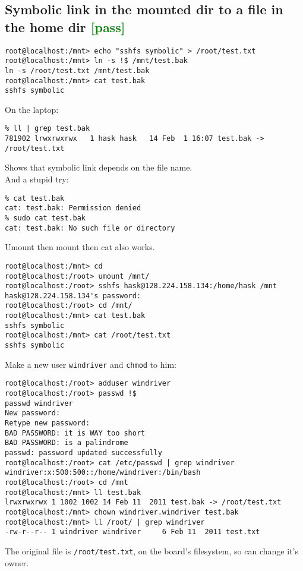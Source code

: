 \documentclass[a4paper]{report}
\begin{document}
\begin{enumerate}
\subsection{Symbolic link in the mounted dir to a file in the home dir
            \textcolor{green}{[pass]}}
\begin{lstlisting}
root@localhost:/mnt> echo "sshfs symbolic" > /root/test.txt 
root@localhost:/mnt> ln -s !$ /mnt/test.bak
ln -s /root/test.txt /mnt/test.bak
root@localhost:/mnt> cat test.bak 
sshfs symbolic
\end{lstlisting}
On the laptop:
\begin{lstlisting}
% ll | grep test.bak
781902 lrwxrwxrwx   1 hask hask   14 Feb  1 16:07 test.bak -> /root/test.txt
\end{lstlisting}
Shows that symbolic link depends on the file name.\\
And a stupid try:
\begin{lstlisting}
% cat test.bak          
cat: test.bak: Permission denied
% sudo cat test.bak
cat: test.bak: No such file or directory
\end{lstlisting}
Umount then mount then cat also works.
\begin{lstlisting}
root@localhost:/mnt> cd 
root@localhost:/root> umount /mnt/
root@localhost:/root> sshfs hask@128.224.158.134:/home/hask /mnt
hask@128.224.158.134's password: 
root@localhost:/root> cd /mnt/
root@localhost:/mnt> cat test.bak 
sshfs symbolic
root@localhost:/mnt> cat /root/test.txt 
sshfs symbolic
\end{lstlisting}
Make a new user {\tt windriver} and {\tt chmod} to him:
\begin{lstlisting}
root@localhost:/root> adduser windriver
root@localhost:/root> passwd !$
passwd windriver
New password: 
Retype new password: 
BAD PASSWORD: it is WAY too short
BAD PASSWORD: is a palindrome
passwd: password updated successfully
root@localhost:/root> cat /etc/passwd | grep windriver
windriver:x:500:500::/home/windriver:/bin/bash
root@localhost:/root> cd /mnt
root@localhost:/mnt> ll test.bak
lrwxrwxrwx 1 1002 1002 14 Feb 11  2011 test.bak -> /root/test.txt
root@localhost:/mnt> chown windriver.windriver test.bak 
root@localhost:/mnt> ll /root/ | grep windriver
-rw-r--r-- 1 windriver windriver     6 Feb 11  2011 test.txt
\end{lstlisting}
The original file is {\tt /root/test.txt}, on the board's filesystem, 
so can change it's owner.\\\\

\end{enumerate}
\end{document}
